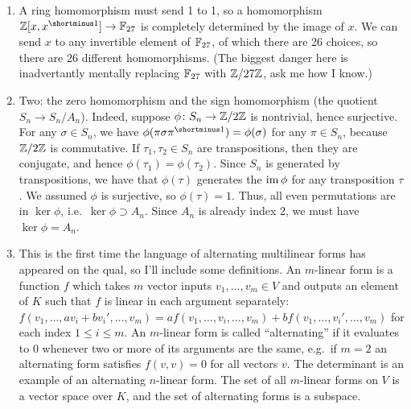 \begin{solution}
\begin{enumerate}
    \item A ring homomorphism must send 1 to 1, so a homomorphism $\Z[x,x\inv] \to \F_{27}$ is completely determined by the image of $x$. We can send $x$ to any invertible element of $\mathbb{F}_{27}$, of which there are 26 choices, so there are 26 different homomorphisms. (The biggest danger here is inadvertantly mentally replacing $\mathbb{F}_{27}$ with $\mathbb{Z}/27\mathbb{Z}$, ask me how I know.)
    \item Two: the zero homomorphism and the sign homomorphism (the quotient $S_n \to S_n/A_n$). Indeed, suppose $\phi\colon S_n \to \mathbb{Z}/2\mathbb{Z}$ is nontrivial, hence surjective. For any $\sigma \in S_n$, we have $\phi(\pi \sigma \pi\inv) = \phi(\sigma)$ for any $\pi \in S_n$, because $\mathbb{Z}/2\mathbb{Z}$ is commutative. If $\tau_1, \tau_2 \in S_n$ are transpositions, then they are conjugate, and hence $\phi(\tau_1) = \phi(\tau_2)$. Since $S_n$ is generated by transpositions, we have that $\phi(\tau)$ generates the $\operatorname{im} \phi$ for any transposition $\tau$. We assumed $\phi$ is surjective, so $\phi(\tau) = 1$. Thus, all even permutations are in $\ker \phi$, i.e.\ $\ker \phi \supset A_n$. Since $A_n$ is already index 2, we must have $\ker \phi = A_n$.
    \item This is the first time the language of alternating multilinear forms has appeared on the qual, so I'll include some definitions. An $m$-linear form is a function $f$ which takes $m$ vector inputs $v_1,\dots,v_m \in V$ and outputs an element of $K$ such that $f$ is linear in each argument separately: $f(v_1,\dots,av_i + b v_i',\dots,v_m) = a f(v_1,\dots,v_i,\dots,v_m) + b f(v_1,\dots,v_i',\dots,v_m)$ for each index $1 \leq i \leq m$. An $m$-linear form is called ``alternating'' if it evaluates to 0 whenever two or more of its arguments are the same, e.g.\ if $m=2$ an alternating form satisfies $f(v,v)=0$ for all vectors $v$. The determinant is an example of an alternating $n$-linear form. The set of all $m$-linear forms on $V$ is a vector space over $K$, and the set of alternating forms is a subspace.
    

\end{enumerate}
\end{solution}

